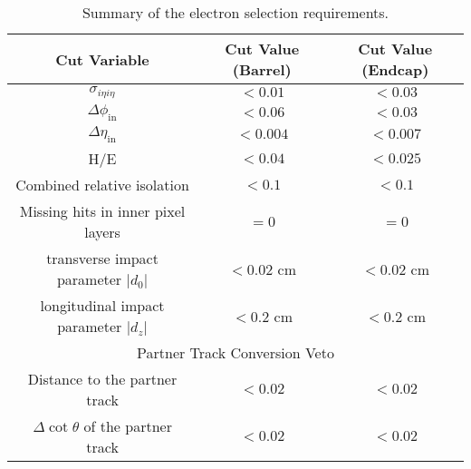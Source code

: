 \begin{table}[!ht]
\begin{center}
\begin{tabular}{|c|c|c|}
\hline
 Cut Variable           &   Cut Value (Barrel)                   & Cut Value (Endcap)    \\
\hline
 $\sigma_{i\eta i\eta}$      &   $<0.01$                              & $<0.03$               \\ 
 $\Delta\phi_{\mathrm{in}}$  &   $<0.06$                              & $<0.03$               \\ 
 $\Delta\eta_{\mathrm{in}}$  &   $<0.004$                             & $<0.007$               \\ 
 H/E                         &  $<0.04$                          &   $< 0.025$          \\ 
 Combined relative isolation &  $<0.1$                           &  $<0.1$              \\
 Missing hits in inner pixel layers  &   $=0$      &  $=0$           \\ 
 transverse impact parameter $|d_{0}|$  &  $<0.02$ cm   & $<0.02$ cm    \\
 longitudinal impact parameter $|d_{z}|$  &  $<0.2$ cm   & $<0.2$ cm    \\
 \hline
 \hline
 \multicolumn{3}{|c|}{Partner Track Conversion Veto} \\
 \hline
 Distance to the partner track       &  $<0.02$    &   $< 0.02$      \\  
 $\Delta{\cot\theta}$ of the partner track   &  $<0.02$    &   $<0.02$      \\ 
 \hline

\hline
\end{tabular}
\caption{Summary of the electron selection requirements. \label{tab:electronSelection}}

\end{center}
\end{table}

